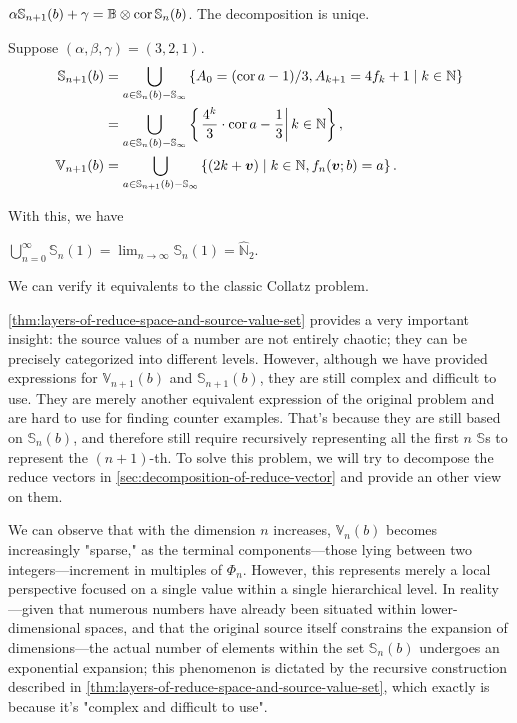 \begin{corollary}\label{cor:source-value-set-equivlants-its-pre-ker-set}
    $\alpha\mathbb{S}_{n+1}(b) + \gamma = \mathbb{B}\otimes\operatorname{cor}\mathbb{S}_{n}(b)$. The decomposition is uniqe.
\end{corollary}
\begin{example}\label{coro:layers-of-reduce-space-and-source-value-set-on-3-2-1}
    Suppose $(\alpha, \beta, \gamma) = (3,2,1)$.
    \begin{align*}
        \mathbb{S}_{n+1}(b) &= \bigcup_{a\in \mathbb{S}_{n}(b) - \mathbb{S}_{\infty}} \left\{A_0 = (\operatorname{cor} a  - 1)/3, A_{k+1} = 4f_{k} + 1 \mid k\in\mathbb{N}\right\} \\
        &= \bigcup_{a\in \mathbb{S}_{n}(b) - \mathbb{S}_{\infty}} \left\{\left.\frac{4^{k}}{3}\cdot\operatorname{cor} a - \frac{1}{3}\right\vert k\in \mathbb{N}\right\},\\
        \mathbb{V}_{n+1}(b) &= \bigcup_{a\in \mathbb{S}_{n+1}(b) - \mathbb{S}_{\infty}}\left\{ (2k + \bm{v}) \mid k\in \mathbb{N}, f_{n}(\bm{v};b) = a \right\}.
    \end{align*}
\end{example}
With this, we have
\begin{conjecture}\label{conj:source-value-of-1-cover-all-odd-numbers}
    $\bigcup_{n=0}^{\infty}\mathbb{S}_n(1) = \lim_{n\to\infty}\mathbb{S}_n(1) = \widehat{\mathbb{N}}_{{2}}$.
\end{conjecture}
We can verify it equivalents to the classic Collatz problem.

\cref{thm:layers-of-reduce-space-and-source-value-set} provides a very important insight: the source values of a number are not entirely chaotic; they can be precisely categorized into different levels.
However, although we have provided expressions for $\mathbb{V}_{n+1}(b)$ and $\mathbb{S}_{n+1}(b)$, they are still complex and difficult to use.
They are merely another equivalent expression of the original problem and are hard to use for finding counter examples.
That's because they are still based on $\mathbb{S}_{n}(b)$, and therefore still require recursively representing all the first $n$ $\mathbb{S}$s to represent the $(n+1)$-th. To solve this problem, we will try to decompose the reduce vectors in \cref{sec:decomposition-of-reduce-vector} and provide an other view on them.

We can observe that with the dimension $n$ increases, $\mathbb{V}_{n}(b)$ becomes increasingly "sparse," as the terminal components—those lying between two integers—increment in multiples of $\Phi_{n}$. However, this represents merely a local perspective focused on a single value within a single hierarchical level. In reality—given that numerous numbers have already been situated within lower-dimensional spaces, and that the original source itself constrains the expansion of dimensions—the actual number of elements within the set $\mathbb{S}_{n}(b)$ undergoes an exponential expansion; this phenomenon is dictated by the recursive construction described in \cref{thm:layers-of-reduce-space-and-source-value-set}, which exactly is because it's "complex and difficult to use".

